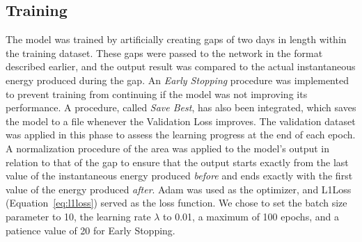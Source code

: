 \subsection{Training}
The model was trained by artificially creating gaps of two days in length within the
training dataset.
These gaps were passed to the network in the format described earlier,
and the output result was compared to the actual instantaneous energy produced during the gap.
An \textit{Early Stopping}\cite{es} procedure was implemented to prevent training from continuing if
the model was not improving its performance.
A procedure, called \textit{Save Best}, has also been integrated,
which saves the model to a file whenever the Validation Loss improves.
The validation dataset was applied in this phase to assess the learning progress at the end
of each epoch.
A normalization procedure of the area was applied to the model's output in relation to
that of the gap to ensure that the output starts exactly from the last value of the
instantaneous energy produced \textit{before} and ends exactly with the first value
of the energy produced \textit{after}. Adam\cite{adam} was used as the optimizer,
and L1Loss\cite{loss} (Equation~\ref{eq:l1loss}) served as the loss function.
We chose to set the batch size parameter to 10, the learning rate $\lambda$ to 0.01,
a maximum of 100 epochs, and a patience value of 20 for Early Stopping.


